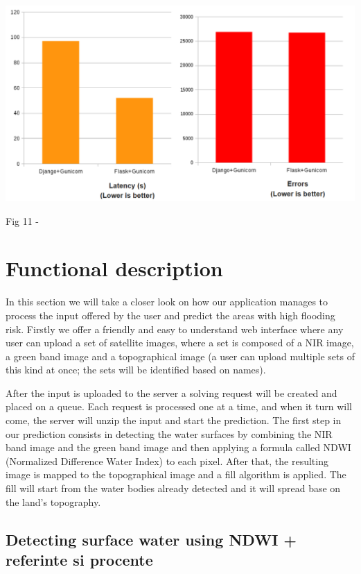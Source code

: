 \documentclass[12pt, a4paper]{report}
\begin{document}
\medskip
\includegraphics[scale=0.6, center]{django-flask-latency.png}
\begin{center}
Fig 11 - \cite{Flask2}
\end{center}




\section{Functional description}

\quad
In this section we will take a closer look on how our application manages to process the input offered by the user and predict the areas with high flooding risk. Firstly we offer a friendly and easy to understand web interface where any user can upload a set of satellite images, where a set is composed of a NIR image, a green band image and a topographical image (a user can upload multiple sets of this kind at once; the sets will be identified based on names).
\par 
 After the input is uploaded to the server a solving request will be created and placed on a queue. Each request is processed one at a time, and when it turn will come, the server will unzip the input and start the prediction. The first step in our prediction consists in detecting the water surfaces by combining the NIR band image and the green band image and then applying a formula called NDWI (Normalized Difference Water Index) to each pixel. After that, the resulting image is mapped to the topographical image and a fill algorithm is applied. The fill will start from the water bodies already detected and it will spread base on the land's topography.


\subsection{Detecting surface water using NDWI + referinte si procente}
\quad 
\end{document}
